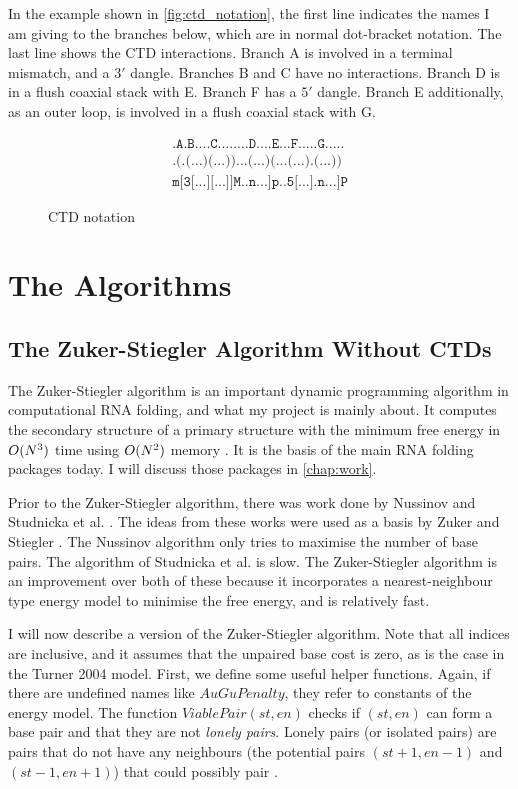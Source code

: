 \documentclass{cshonours}
\DeclarePairedDelimiter{\bo}{O(}{)}
\begin{document}
In the example shown in \autoref{fig:ctd_notation}, the first line indicates the names I am giving to the branches below, which are in normal dot-bracket notation. The last line shows the CTD interactions. Branch A is involved in a terminal mismatch, and a $3'$ dangle. Branches B and C have no interactions. Branch D is in a flush coaxial stack with E. Branch F has a $5'$ dangle. Branch E additionally, as an outer loop, is involved in a flush coaxial stack with G.
\begin{figure}
\begin{align*}
\texttt{.A.B....C........D....E...F.....G.....} \\
\texttt{.(.(...)(...))...(...)(...(...).(...))} \\
\texttt{m[3[...][...]]M..n...]p..5[...].n...]P}
\end{align*}
\caption{CTD notation}
\label{fig:ctd_notation}
\end{figure}

\chapter{The Algorithms}
\section{The Zuker-Stiegler Algorithm Without CTDs}
The Zuker-Stiegler algorithm is an important dynamic programming algorithm in computational RNA folding, and what my project is mainly about. It computes the secondary structure of a primary structure with the minimum free energy in $\bo{N^3}$ time using $\bo{N^2}$ memory \cite{zukerDp}. It is the basis of the main RNA folding packages today. I will discuss those packages in \autoref{chap:work}.

Prior to the Zuker-Stiegler algorithm, there was work done by Nussinov \cite{nussinovDp} and Studnicka et al. \cite{studnickaDp}. The ideas from these works were used as a basis by Zuker and Stiegler \cite{zukerDp}. The Nussinov algorithm only tries to maximise the number of base pairs. The algorithm of Studnicka et al. is slow. The Zuker-Stiegler algorithm is an improvement over both of these because it incorporates a nearest-neighbour type energy model to minimise the free energy, and is relatively fast.

I will now describe a version of the Zuker-Stiegler algorithm. Note that all indices are inclusive, and it assumes that the unpaired base cost is zero, as is the case in the Turner 2004 model. First, we define some useful helper functions. Again, if there are undefined names like $AuGuPenalty$, they refer to constants of the energy model. The function $ViablePair(st, en)$ checks if $(st, en)$ can form a base pair and that they are not \emph{lonely pairs}. Lonely pairs (or isolated pairs) are pairs that do not have any neighbours (the potential pairs $(st + 1, en - 1)$ and $(st - 1, en + 1)$) that could possibly pair \cite{mathewsLonely}.
\end{document}
